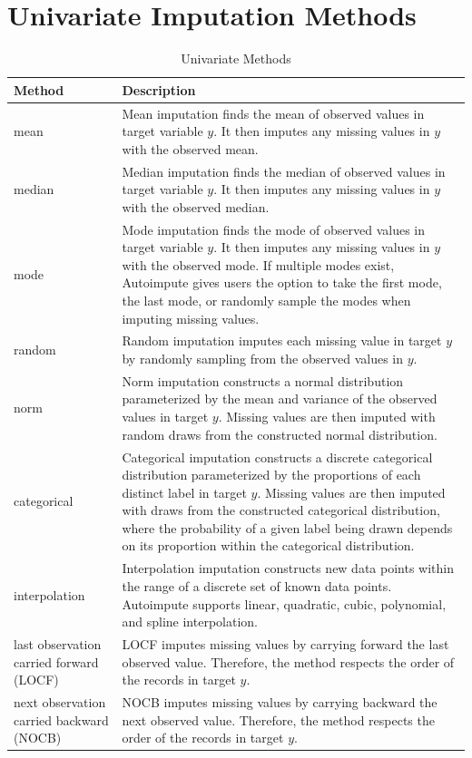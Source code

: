 \documentclass[12pt,oneside]{chicagocapstone}
\begin{document}
\chapter{Univariate Imputation
Methods}\label{univariate-imputation-methods}
\begin{table}[!h]

\caption{\label{tab:appendixeunivar}Univariate Methods}
\begin{tabu} to 
\toprule
\begingroup\fontsize{13}{15}\selectfont \textbf{Method}\endgroup & \begingroup\fontsize{13}{15}\selectfont \textbf{Description}\endgroup\\
\midrule
mean & Mean imputation finds the mean of observed values in target variable $y$. It then imputes any missing values in $y$ with the observed mean.\\
median & Median imputation finds the median of observed values in target variable $y$. It then imputes any missing values in $y$ with the observed median.\\
mode & Mode imputation finds the mode of observed values in target variable $y$. It then imputes any missing values in $y$ with the observed mode. If multiple modes exist, Autoimpute gives users the option to take the first mode, the last mode, or randomly sample the modes when imputing missing values.\\
random & Random imputation imputes each missing value in target $y$ by randomly sampling from the observed values in $y$.\\
norm & Norm imputation constructs a normal distribution parameterized by the mean and variance of the observed values in target $y$. Missing values are then imputed with random draws from the constructed normal distribution.\\
\addlinespace
categorical & Categorical imputation constructs a discrete categorical distribution parameterized by the proportions of each distinct label in target $y$. Missing values are then imputed with draws from the constructed categorical distribution, where the probability of a given label being drawn depends on its proportion within the categorical distribution.\\
interpolation & Interpolation imputation constructs new data points within the range of a discrete set of known data points. Autoimpute supports linear, quadratic, cubic, polynomial, and spline interpolation.\\
last observation carried forward (LOCF) & LOCF imputes missing values by carrying forward the last observed value. Therefore, the method respects the order of the records in target $y$.\\
next observation carried backward (NOCB) & NOCB imputes missing values by carrying backward the next observed value. Therefore, the method respects the order of the records in target $y$.\\
\bottomrule
\end{tabu}
\end{table}
\end{document}

